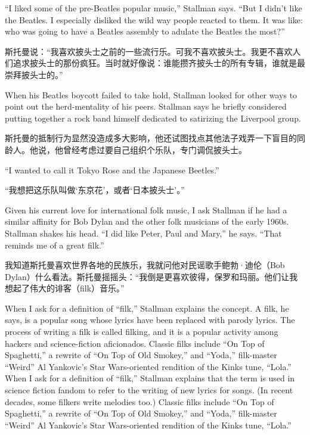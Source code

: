 \ifdefined\eng
``I liked some of the pre-Beatles popular music,'' Stallman says. ``But I didn't like the Beatles. I especially disliked the wild way people reacted to them. It was like: who was going to have a Beatles assembly to adulate the Beatles the most?''
\fi

\ifdefined\chs
斯托曼说：``我喜欢披头士之前的一些流行乐。可我不喜欢披头士。我更不喜欢人们追求披头士的那份疯狂。当时就好像说：谁能攒齐披头士的所有专辑，谁就是最崇拜披头士的。''
\fi

\ifdefined\eng
When his Beatles boycott failed to take hold, Stallman looked for other ways to point out the herd-mentality of his peers. Stallman says he briefly considered putting together a rock band himself dedicated to satirizing the Liverpool group.
\fi

\ifdefined\chs
斯托曼的抵制行为显然没造成多大影响，他还试图找点其他法子戏弄一下盲目的同龄人。他说，他曾经考虑过要自己组织个乐队，专门调侃披头士。
\fi

\ifdefined\eng
``I wanted to call it Tokyo Rose and the Japanese Beetles.''
\fi

\ifdefined\chs
``我想把这乐队叫做`东京花'，或者`日本披头士'。''
\fi

\ifdefined\eng
Given his current love for international folk music, I ask Stallman if he had a similar affinity for Bob Dylan and the other folk musicians of the early 1960s. Stallman shakes his head. ``I did like Peter, Paul and Mary,'' he says. ``That reminds me of a great filk.''
\fi

\ifdefined\chs
我知道斯托曼喜欢世界各地的民族乐，我就问他对民谣歌手鲍勃·迪伦（Bob Dylan）什么看法。斯托曼摇摇头：``我倒是更喜欢彼得，保罗和玛丽。他们让我想起了伟大的诽客（filk）音乐。''
\fi

\ifdefined\eng
\ifdefined\vone
When I ask for a definition of ``filk,'' Stallman explains the concept. A filk, he says, is a popular song whose lyrics have been replaced with parody lyrics. The process of writing a filk is called filking, and it is a popular activity among hackers and science-fiction aficionados. Classic filks include ``On Top of Spaghetti,'' a rewrite of ``On Top of Old Smokey,'' and ``Yoda,'' filk-master ``Weird'' Al Yankovic's Star Wars-oriented rendition of the Kinks tune, ``Lola.''
\fi
\ifdefined\vtwo
When I ask for a definition of ``filk,'' Stallman explains that the term is used in science fiction fandom to refer to the writing of new lyrics for songs.  (In recent decades, some filkers write melodies too.)  Classic filks include ``On Top of Spaghetti,'' a rewrite of ``On Top of Old Smokey,'' and ``Yoda,'' filk-master ``Weird'' Al Yankovic's Star Wars-oriented rendition of the Kinks tune, ``Lola.''
\fi
\fi

